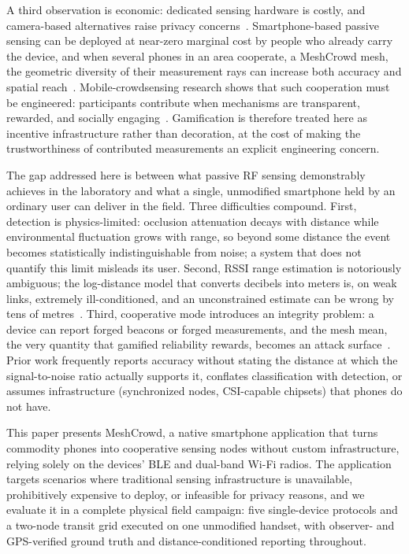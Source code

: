 \documentclass[conference,10pt]{IEEEtran}
\begin{document}
A third observation is economic: dedicated sensing hardware is costly, and
camera-based alternatives raise privacy
concerns~\cite{khan2023,zhou2020}. Smartphone-based passive sensing
can be deployed at near-zero marginal cost by people who already carry the
device, and when several phones in an area cooperate, a MeshCrowd mesh, the
geometric diversity of their measurement rays can increase both accuracy and
spatial reach~\cite{wilson2010,patwari2010proc}. Mobile-crowdsensing research shows that such
cooperation must be engineered: participants contribute when mechanisms are
transparent, rewarded, and socially engaging~\cite{zhang2022,wang2018}.
Gamification is therefore treated here as incentive infrastructure rather
than decoration, at the cost of making the trustworthiness of contributed
measurements an explicit engineering concern.

The gap addressed here is between what passive RF sensing demonstrably
achieves in the laboratory and what a single, unmodified smartphone held by
an ordinary user can deliver in the field. Three difficulties compound.
First, detection is physics-limited: occlusion attenuation decays with
distance while environmental fluctuation grows with range, so beyond some
distance the event becomes statistically indistinguishable from noise; a
system that does not quantify this limit misleads its user. Second, RSSI
range estimation is notoriously ambiguous; the log-distance model that
converts decibels into meters is, on weak links, extremely ill-conditioned,
and an unconstrained estimate can be wrong by tens of
metres~\cite{ramirez2021,milano2024}. Third, cooperative mode introduces an
integrity problem: a device can report forged beacons or forged measurements,
and the mesh mean, the very quantity that gamified reliability rewards,
becomes an attack surface~\cite{casar2022,antonioli2020,ryan2013woot}. Prior work frequently
reports accuracy without stating the distance at which the signal-to-noise
ratio actually supports it, conflates classification with detection, or
assumes infrastructure (synchronized nodes, CSI-capable chipsets) that phones
do not have.

This paper presents MeshCrowd, a native smartphone application that turns
commodity phones into cooperative sensing nodes without custom
infrastructure, relying solely on the devices' BLE and dual-band Wi-Fi
radios. The application targets scenarios where traditional sensing
infrastructure is unavailable, prohibitively expensive to deploy, or
infeasible for privacy reasons, and we evaluate it in a complete physical
field campaign: five single-device protocols and a two-node transit grid
executed on one unmodified handset, with observer- and GPS-verified ground
truth and distance-conditioned reporting throughout.
\end{document}
